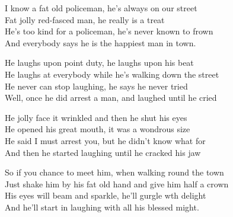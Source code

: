 \vspace{10pt}
\par
I know a fat old policeman, he's always on our street\\
Fat jolly red-fasced man, he really is a treat\\
He's too kind for a policeman, he's never known to frown\\
And everybody says he is the happiest man in town.\par
\vspace{10pt}
He laughs upon point duty, he laughs upon his beat\\
He laughs at everybody while he's walking down the street\\
He never can stop laughing, he says he never tried\\
Well, once he did arrest a man, and laughed until he cried\par
\vspace{10pt}
He jolly face it wrinkled and then he shut his eyes\\
He opened his great mouth, it was a wondrous size\\
He said I must arrest you, but he didn't know what for\\
And then he started laughing until he cracked his jaw\par
\vspace{10pt}
So if you chance to meet him, when walking round the town\\
Just shake him by his fat old hand and give him half a crown\\
His eyes will beam and sparkle, he'll gurgle wth delight\\
And he'll start in laughing with all his blessed might.
